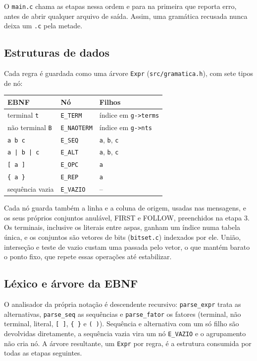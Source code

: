 \documentclass[11pt,a4paper]{article}
\begin{document}
O \texttt{main.c} chama as etapas nessa ordem e para na primeira que reporta erro, antes de abrir
qualquer arquivo de saída. Assim, uma gramática recusada nunca deixa um \texttt{.c} pela metade.

\subsection{Estruturas de dados}

Cada regra é guardada como uma árvore \texttt{Expr} (\texttt{src/gramatica.h}), com sete tipos de
nó:

\begin{center}
\begin{tabular}{@{}lll@{}}
\toprule
EBNF & Nó & Filhos \\
\midrule
terminal \texttt{t} & \texttt{E\_TERM} & índice em \texttt{g->terms} \\
não terminal \texttt{B} & \texttt{E\_NAOTERM} & índice em \texttt{g->nts} \\
\texttt{a b c} & \texttt{E\_SEQ} & \texttt{a}, \texttt{b}, \texttt{c} \\
\texttt{a | b | c} & \texttt{E\_ALT} & \texttt{a}, \texttt{b}, \texttt{c} \\
\texttt{[ a ]} & \texttt{E\_OPC} & \texttt{a} \\
\texttt{\{ a \}} & \texttt{E\_REP} & \texttt{a} \\
sequência vazia & \texttt{E\_VAZIO} & -- \\
\bottomrule
\end{tabular}
\end{center}

Cada nó guarda também a linha e a coluna de origem, usadas nas mensagens, e os seus próprios
conjuntos anulável, FIRST e FOLLOW, preenchidos na etapa 3. Os terminais, inclusive os literais
entre aspas, ganham um índice numa tabela única, e os conjuntos são vetores de bits
(\texttt{bitset.c}) indexados por ele. União, interseção e teste de vazio custam uma passada pelo
vetor, o que mantém barato o ponto fixo, que repete essas operações até estabilizar.

\subsection{Léxico e árvore da EBNF}

O analisador da própria notação é descendente recursivo: \texttt{parse\_expr} trata as
alternativas, \texttt{parse\_seq} as sequências e \texttt{parse\_fator} os fatores
(terminal, não terminal, literal, \texttt{[ ]}, \texttt{\{ \}} e \texttt{( )}). Sequência e
alternativa com um só filho são devolvidas diretamente, a sequência vazia vira um nó
\texttt{E\_VAZIO} e o agrupamento não cria nó. A árvore resultante, um \texttt{Expr} por regra,
é a estrutura consumida por todas as etapas seguintes.
\end{document}
